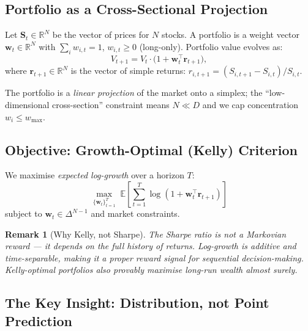 \documentclass[11pt, a4paper]{article}
\newtheorem{remark}{Remark}
\begin{document}
\subsection{Portfolio as a Cross-Sectional Projection}

Let $\mathbf{S}_t \in \mathbb{R}^N$ be the vector of prices for $N$ stocks.
A portfolio is a weight vector $\mathbf{w}_t \in \mathbb{R}^N$ with
$\sum_i w_{i,t} = 1$, $w_{i,t} \geq 0$ (long-only).  Portfolio value evolves as:
\[
  V_{t+1} = V_t \cdot \bigl(1 + \mathbf{w}_t^\top \mathbf{r}_{t+1}\bigr),
\]
where $\mathbf{r}_{t+1} \in \mathbb{R}^N$ is the vector of simple returns:
$r_{i,t+1} = (S_{i,t+1} - S_{i,t})/S_{i,t}$.

The portfolio is a \emph{linear projection} of the market onto a simplex; the
``low-dimensional cross-section'' constraint means $N \ll D$ and we cap
concentration $w_i \leq w_{\max}$.

\subsection{Objective: Growth-Optimal (Kelly) Criterion}

We maximise \emph{expected log-growth} over a horizon $T$:
\begin{equation}\label{eq:kelly}
  \max_{\{\mathbf{w}_t\}_{t=1}^T}\;
  \mathbb{E}\!\left[\sum_{t=1}^{T} \log\!\left(1 + \mathbf{w}_t^\top
  \mathbf{r}_{t+1}\right)\right]
\end{equation}
subject to $\mathbf{w}_t \in \Delta^{N-1}$ and market constraints.

\begin{remark}[Why Kelly, not Sharpe]
The Sharpe ratio is not a Markovian reward — it depends on the full history of
returns.  Log-growth is additive and time-separable, making it a proper reward
signal for sequential decision-making.  Kelly-optimal portfolios also provably
maximise long-run wealth almost surely.
\end{remark}

\subsection{The Key Insight: Distribution, not Point Prediction}
\end{document}
